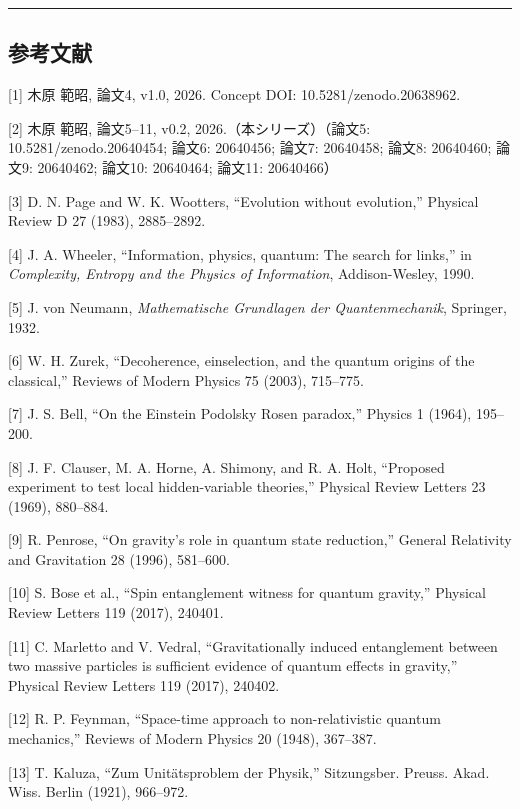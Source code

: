 \documentclass[
]{ltjsarticle}
\begin{document}
\begin{center}\rule{0.5\linewidth}{0.5pt}\end{center}

\subsection{参考文献}\label{ux53c2ux8003ux6587ux732e}

{[}1{]} 木原 範昭, 論文4, v1.0, 2026. Concept DOI:
10.5281/zenodo.20638962.

{[}2{]} 木原 範昭, 論文5--11, v0.2, 2026.（本シリーズ）（論文5:
10.5281/zenodo.20640454; 論文6: 20640456; 論文7: 20640458; 論文8:
20640460; 論文9: 20640462; 論文10: 20640464; 論文11: 20640466）

{[}3{]} D. N. Page and W. K. Wootters, ``Evolution without evolution,''
Physical Review D 27 (1983), 2885--2892.

{[}4{]} J. A. Wheeler, ``Information, physics, quantum: The search for
links,'' in \emph{Complexity, Entropy and the Physics of Information},
Addison-Wesley, 1990.

{[}5{]} J. von Neumann, \emph{Mathematische Grundlagen der
Quantenmechanik}, Springer, 1932.

{[}6{]} W. H. Zurek, ``Decoherence, einselection, and the quantum
origins of the classical,'' Reviews of Modern Physics 75 (2003),
715--775.

{[}7{]} J. S. Bell, ``On the Einstein Podolsky Rosen paradox,'' Physics
1 (1964), 195--200.

{[}8{]} J. F. Clauser, M. A. Horne, A. Shimony, and R. A. Holt,
``Proposed experiment to test local hidden-variable theories,'' Physical
Review Letters 23 (1969), 880--884.

{[}9{]} R. Penrose, ``On gravity's role in quantum state reduction,''
General Relativity and Gravitation 28 (1996), 581--600.

{[}10{]} S. Bose et al., ``Spin entanglement witness for quantum
gravity,'' Physical Review Letters 119 (2017), 240401.

{[}11{]} C. Marletto and V. Vedral, ``Gravitationally induced
entanglement between two massive particles is sufficient evidence of
quantum effects in gravity,'' Physical Review Letters 119 (2017),
240402.

{[}12{]} R. P. Feynman, ``Space-time approach to non-relativistic
quantum mechanics,'' Reviews of Modern Physics 20 (1948), 367--387.

{[}13{]} T. Kaluza, ``Zum Unitätsproblem der Physik,'' Sitzungsber.
Preuss. Akad. Wiss. Berlin (1921), 966--972.
\end{document}
